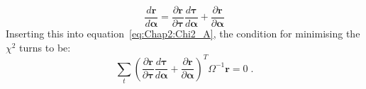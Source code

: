 \begin{equation*}
	\frac{d  \bm{r} }{d \bm{\alpha}} =
	 \frac{\partial  \bm{r} }{\partial \bm{\tau}} \frac{d  \bm{\tau} }{d \bm{\alpha}} + 
	  \frac{\partial  \bm{r} }{\partial \bm{\alpha}} 
\end{equation*}
Inserting this into equation~\ref{eq:Chap2:Chi2_A}, the condition for minimising the $\chi^{2}$ turns 
to be:
\begin{equation}\label{eq:Chap2:Chi2_B}
	\sum_{t} \left(\frac{\partial  \bm{r} }{\partial \bm{\tau}} \frac{d  \bm{\tau} }{d \bm{\alpha}} + 
	  \frac{\partial  \bm{r} }{\partial \bm{\alpha}} \right)^{T} \Omega^{-1} \bm{r} = 0 \; .
\end{equation}

%

